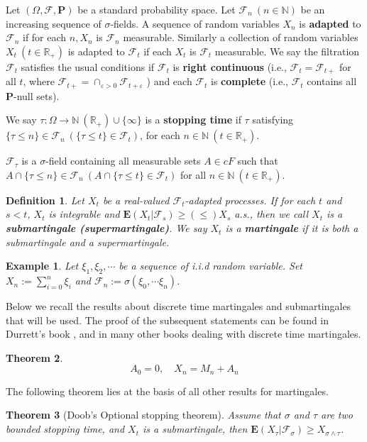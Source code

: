 \documentclass[twoside, 12pt]{book}
\numberwithin{equation}{chapter}
\newtheorem{theorem}{Theorem}[section]
\newtheorem{definition}[theorem]{Definition}
\newtheorem{example}{Example}
\def\cF{{\mathcal F}}
\def\mN{{\mathbb N}}
\def\mR{{\mathbb R}}
\def\bE{{\mathbf E}}
\def\bP{{\mathbf P}}
\def\geq{\geqslant}
\def\leq{\leqslant}
\begin{document}
	
	Let $(\Omega, \cF, \bP)$ be a standard probability space. Let $\mathcal{F}_n\ (n\in \mN)$ be an increasing sequence of $\sigma$-fields. A sequence of random variables $X_n$ is {\bf adapted} to $\mathcal{F}_n$ if for each $n, X_n$ is $\mathcal{F}_n$ measurable. Similarly a collection of random variables $X_t\ (t\in \mR_+)$ is adapted to $\mathcal{F}_t$ if each $X_t$ is $\mathcal{F}_t$ measurable. We say the filtration $\mathcal{F}_t$ satisfies the usual conditions if $\mathcal{F}_t$ is {\bf right continuous} (i.e., $\mathcal{F}_t=\mathcal{F}_{t+}$ for all $t$, where $\mathcal{F}_{t+}=\cap_{\varepsilon>0} \mathcal{F}_{t+\varepsilon}$ ) and each $\mathcal{F}_t$ is {\bf complete} (i.e., $\mathcal{F}_t$ contains all $\mathbf{P}$-null sets). %
	 
	We say $\tau: \Omega\to \mN \ (\mR_+) \cup\{\infty\}$ is a {\bf stopping time} if $\tau$ satisfying $\{\tau\leq n\}\in \cF_n \ (\{\tau\leq t\}\in \cF_t)$, for each $n\in \mN \ (t\in \mR_+)$.  
	 
	$\mathcal{F}_\tau$ is a $\sigma$-field containing all measurable sets $A\in cF$ such that $A \cap \{\tau \leq n\} \in \mathcal{F}_n\ (A \cap \{\tau \leq t\} \in\cF_t)$ for all $n\in \mN\ (t \in \mR_+)$. 
		
	\begin{definition}
		Let $X_t$ be a real-valued $\cF_t$-adapted processes. If for each $t$ and $s<t$, $X_t$ is integrable and $\bE(X_t | \cF_s) \geq (\leq) X_s$ a.s., then we call $X_t$ is a {\bf submartingale (supermartingale)}. We say $X_t$ is a {\bf martingale} if it is both a submartingale and a supermartingale. 
	\end{definition}
	
	\begin{example}
		Let $\xi_1, \xi_2, \cdots$ be a sequence of i.i.d random variable. Set $X_n:=\sum_{i=0}^n \xi_i$ and $\cF_n:=\sigma(\xi_0,\cdots \xi_n)$. 
	\end{example}
	
 Below we recall the results about discrete time martingales and submartingales that will be used. The proof of the subsequent statements can be found in Durrett’s book \cite{durrett2019probability}, and in many other books dealing with discrete time martingales.
	\begin{theorem}
		\begin{equation}
			A_0=0, \quad X_n=M_n+A_n
		\end{equation}
	\end{theorem}
	The following theorem lies at the basis of all other results for
	martingales.
	\begin{theorem}[Doob's Optional stopping theorem]\label{thm:Doob}
		Assume that $\sigma$ and $\tau$ are two bounded stopping time, and $X_t$ is a submartingale, then $\bE (X_{\tau}|\cF_{\sigma}) \geq  X_{\sigma\wedge \tau}$.  
	\end{theorem}
	
\end{document}

